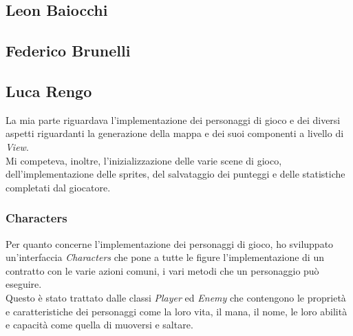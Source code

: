 \newpage

\subsection*{Leon Baiocchi}


\newpage

\subsection*{Federico Brunelli}


\newpage

\subsection*{Luca Rengo}

\textsf{\small La mia parte riguardava l'implementazione dei personaggi di gioco e dei diversi aspetti riguardanti la generazione della mappa e dei suoi componenti a livello di \emph{View}.}\\

\textsf{\small Mi competeva, inoltre, l'inizializzazione delle varie scene di gioco, dell'implementazione delle sprites, del salvataggio dei punteggi e delle statistiche completati dal giocatore.}\\ 

\subsubsection*{Characters}

\textsf{\small Per quanto concerne l'implementazione dei personaggi di gioco, ho sviluppato un'interfaccia \emph{Characters} che pone a tutte le figure l'implementazione di un contratto con le varie azioni comuni, i vari metodi che un personaggio può eseguire.}\\

\textsf{\small Questo è stato trattato dalle classi \emph{Player} ed \emph{Enemy} che contengono le proprietà e caratteristiche dei personaggi come la loro vita, il mana, il nome, le loro abilità e capacità come quella di muoversi e saltare.}\\

